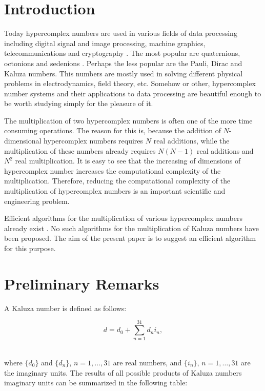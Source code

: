 \documentclass{jtacs}
\numberwithin{equation}{section}
\begin{document}
\section{Introduction}

Today hypercomplex numbers \cite{1} are used in various fields of data processing including digital signal and image processing, machine graphics, telecommunications and cryptography \cite{2,3,4,5,6,7,8,9,10}. The most popular are quaternions, octonions and sedenions \cite{1}. Perhaps the less popular are the Pauli, Dirac and Kaluza numbers. This numbers are mostly used in solving different physical problems in electrodynamics, field
theory, etc. Somehow or other, hypercomplex number systems and their applications to data processing are beautiful enough to be worth studying simply for the pleasure of it.

The multiplication of two hypercomplex numbers is often one of the more time consuming operations. The reason for this is, because the addition of $N$-dimensional hypercomplex
numbers requires $N$ real additions, while the multiplication of these numbers already
requires $N(N-1)$ real additions and $N^2$ real multiplication. It is easy to see that the increasing
of dimensions of hypercomplex number increases the computational complexity of the
multiplication. Therefore, reducing the computational complexity of the multiplication of
hypercomplex numbers is an important scientific and engineering problem.

Efficient algorithms for the multiplication of various hypercomplex numbers already exist \cite{12,13,14,15,16,17,18,19,20,21,22,23,24}. No such algorithms for the multiplication of Kaluza numbers have been proposed. The aim of the present paper is to suggest an efficient algorithm for this purpose.

\section{Preliminary Remarks}

A Kaluza number is defined as follows:

\begin{equation}
d=d_{0}+\sum_{n=1}^{31}d_ni_n ,
\label{e1}
\end{equation}
\begin{adjustbox}{margin = 0 10 0 10}
\\
\end{adjustbox}
where $\{d_0\}$  and  $\{d_n\}$, $n=1,\ldots,31$ are real numbers, and
$\{i_n\}$, $n=1,\ldots,31$ are the imaginary units. The results of all possible products of Kaluza numbers imaginary units can be summarized in the following table:
\end{document}
